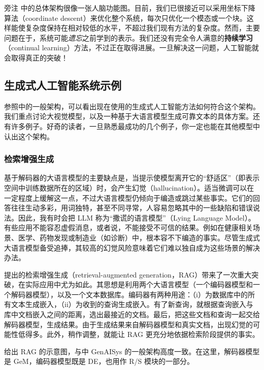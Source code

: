 \begin{booknote}{旁注}
中的总体架构很像一张人脑功能图。目前，我们已很接近可以采用坐标下降算法（coordinate descent）来优化整个系统，每次只优化一个模态或一个块。这样能使复杂度保持在相对较低的水平，不超过我们现有方法的复杂度。然而，主要问题在于，系统可能\emph{遗忘}之前学到的表示。我们还没有完全令人满意的\textbf{持续学习}（continual learning）方法，不过正在取得进展。一旦解决这一问题，人工智能就会取得真正的突破！
\end{booknote}

\subsection{生成式人工智能系统示例}
参照中的一般架构，可以看出现在使用的生成式人工智能方法如何符合这个架构。我们重点讨论大视觉模型，以及一种基于大语言模型生成可靠文本的具体方案。还有许多例子。好奇的读者，一旦熟悉最成功的几个例子，你一定也能在其他模型中认出这个架构。

\subsubsection{检索增强生成}
基于解码器的大语言模型的主要缺点是，当提示使模型离开它的“舒适区”（即表示空间中训练数据所在的区域）时，会产生幻觉（hallucination）。适当微调可以在一定程度上缓解这一点，不过大语言模型仍倾向于编造或跳过某些事实。它们的回答往往生动多彩，用词独特，甚至不同寻常，人容易忽略其中的一些缺陷和错误说法。因此，我有时会把 LLM 称为“撒谎的语言模型”（Lying Language Model）。有些应用不能容忍虚假消息，或者说，不能接受不可信的结果。例如在健康相关场景、医学、药物发现或制造业（如诊断）中，根本容不下编造的事实。尽管生成式大语言模型备受追捧，其较高的幻觉风险意味着它们难以独自成为这些场景的解决办法。

提出的检索增强生成（retrieval-augmented generation，RAG）带来了一次重大突破，在实际应用中尤为如此。其思想是利用两个大语言模型（一个编码器模型和一个解码器模型），以及一个文本数据库。编码器有两种用途：（i）为数据库中的所有文本生成嵌入，（ii）为收到的查询生成嵌入。有了新查询，就根据查询嵌入与库中文档嵌入之间的距离，选出最接近的文档。最后，把这些文档和查询一起交给解码器模型，生成结果。由于生成结果来自解码器模型和真实文档，出现幻觉的可能性低得多。此外，稍作调整，就能让 RAG 更充分地依据检索阶段提供的事实。

给出 RAG 的示意图，与中 GenAISys 的一般架构高度一致。在这里，解码器模型是 GeM，编码器模型既是 DE，也用作 R/S 模块的一部分。

